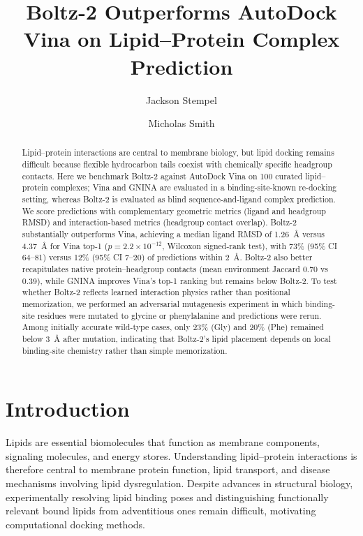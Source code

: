 \documentclass[journal=jcisd8,manuscript=article]{achemso}
\title{Boltz-2 Outperforms AutoDock Vina on Lipid--Protein Complex Prediction}
\author{Jackson Stempel}
\affiliation{Department of Biochemistry \& Cellular and Molecular Biology, University of Tennessee, Knoxville, Tennessee 37996, United States}
\author{Micholas Smith}
\affiliation{Biosciences Division and Center for Molecular Biophysics, Oak Ridge National Laboratory, Oak Ridge, Tennessee 37831, United States}
\begin{document}
\pagestyle{plain}

\doublespacing

\begin{abstract}
Lipid--protein interactions are central to membrane biology, but lipid docking remains difficult because flexible hydrocarbon tails coexist with chemically specific headgroup contacts.
Here we benchmark Boltz-2 against AutoDock Vina on 100 curated lipid--protein complexes; Vina and GNINA are evaluated in a binding-site-known re-docking setting, whereas Boltz-2 is evaluated as blind sequence-and-ligand complex prediction.
We score predictions with complementary geometric metrics (ligand and headgroup RMSD) and interaction-based metrics (headgroup contact overlap).
Boltz-2 substantially outperforms Vina, achieving a median ligand RMSD of \SI{1.26}{\angstrom} versus \SI{4.37}{\angstrom} for Vina top-1 ($p = 2.2 \times 10^{-12}$, Wilcoxon signed-rank test), with 73\% (95\% CI 64--81) versus 12\% (95\% CI 7--20) of predictions within \SI{2}{\angstrom}.
Boltz-2 also better recapitulates native protein--headgroup contacts (mean environment Jaccard 0.70 vs 0.39), while GNINA improves Vina's top-1 ranking but remains below Boltz-2.
To test whether Boltz-2 reflects learned interaction physics rather than positional memorization, we performed an adversarial mutagenesis experiment in which binding-site residues were mutated to glycine or phenylalanine and predictions were rerun.
Among initially accurate wild-type cases, only 23\% (Gly) and 20\% (Phe) remained below \SI{3}{\angstrom} after mutation, indicating that Boltz-2's lipid placement depends on local binding-site chemistry rather than simple memorization.
\end{abstract}

\section{Introduction}

Lipids are essential biomolecules that function as membrane components, signaling molecules, and energy stores.\cite{vanmeer2008membrane}
Understanding lipid--protein interactions is therefore central to membrane protein function, lipid transport, and disease mechanisms involving lipid dysregulation.\cite{escriba2008membranes}
Despite advances in structural biology, experimentally resolving lipid binding poses and distinguishing functionally relevant bound lipids from adventitious ones remain difficult, motivating computational docking methods.\cite{hunte2008lipids}
\end{document}
